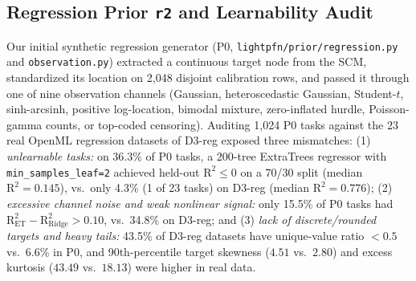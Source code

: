 \documentclass[11pt]{article}
\begin{document}
\subsection{Regression Prior \texttt{r2} and Learnability Audit}
\label{sec:r2-prior}

Our initial synthetic regression generator (P0, \texttt{lightpfn/prior/regression.py} and \texttt{observation.py}) extracted a continuous target node from the SCM, standardized its location on 2,048 disjoint calibration rows, and passed it through one of nine observation channels (Gaussian, heteroscedastic Gaussian, Student-$t$, sinh-arcsinh, positive log-location, bimodal mixture, zero-inflated hurdle, Poisson-gamma counts, or top-coded censoring).
Auditing 1,024 P0 tasks against the 23 real OpenML regression datasets of D3-reg exposed three mismatches: %
(1) \emph{unlearnable tasks:} on 36.3\% of P0 tasks, a 200-tree ExtraTrees regressor with \texttt{min\_samples\_leaf=2} achieved held-out $\mathrm{R}^2 \le 0$ on a 70/30 split (median $\mathrm{R}^2 = 0.145$), vs.\ only 4.3\% (1 of 23 tasks) on D3-reg (median $\mathrm{R}^2 = 0.776$); %
(2) \emph{excessive channel noise and weak nonlinear signal:} only 15.5\% of P0 tasks had $\mathrm{R}^2_{\text{ET}} - \mathrm{R}^2_{\text{Ridge}} > 0.10$, vs.\ 34.8\% on D3-reg; %
and (3) \emph{lack of discrete/rounded targets and heavy tails:} 43.5\% of D3-reg datasets have unique-value ratio $< 0.5$ vs.\ 6.6\% in P0, and 90th-percentile target skewness ($4.51$ vs.\ $2.80$) and excess kurtosis ($43.49$ vs.\ $18.13$) were higher in real data. %
\end{document}

